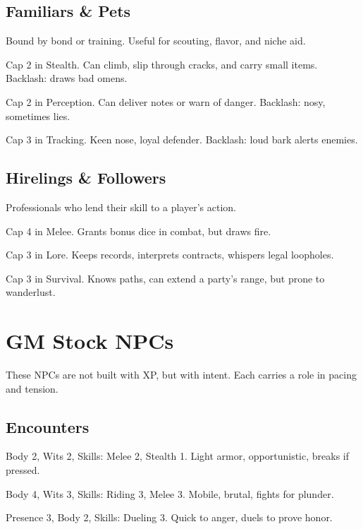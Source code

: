 \documentclass[11pt]{book}
\begin{document}
\subsection{Familiars \& Pets}
Bound by bond or training. Useful for scouting, flavor, and niche aid.  
\begin{description}[leftmargin=2cm]
  \item[Shadow-Cat] Cap 2 in Stealth. Can climb, slip through cracks, and carry small items. Backlash: draws bad omens.  
  \item[Crow Messenger] Cap 2 in Perception. Can deliver notes or warn of danger. Backlash: nosy, sometimes lies.  
  \item[Hound of the Fens] Cap 3 in Tracking. Keen nose, loyal defender. Backlash: loud bark alerts enemies.  
\end{description}

\subsection{Hirelings \& Followers}
Professionals who lend their skill to a player’s action.  
\begin{description}[leftmargin=2cm]
  \item[Bodyguard] Cap 4 in Melee. Grants bonus dice in combat, but draws fire.  
  \item[Scribe] Cap 3 in Lore. Keeps records, interprets contracts, whispers legal loopholes.  
  \item[Scout] Cap 3 in Survival. Knows paths, can extend a party’s range, but prone to wanderlust.  
\end{description}

\section{GM Stock NPCs}
These NPCs are not built with XP, but with intent. Each carries a role in pacing and tension.  

\subsection{Encounters}
\begin{description}[leftmargin=2cm]
  \item[Bandit Skirmisher] Body 2, Wits 2, Skills: Melee 2, Stealth 1. Light armor, opportunistic, breaks if pressed.  
  \item[Ykrul Rider] Body 4, Wits 3, Skills: Riding 3, Melee 3. Mobile, brutal, fights for plunder.  
  \item[Street Bravo] Presence 3, Body 2, Skills: Dueling 3. Quick to anger, duels to prove honor.  
\end{description}
\end{document}
